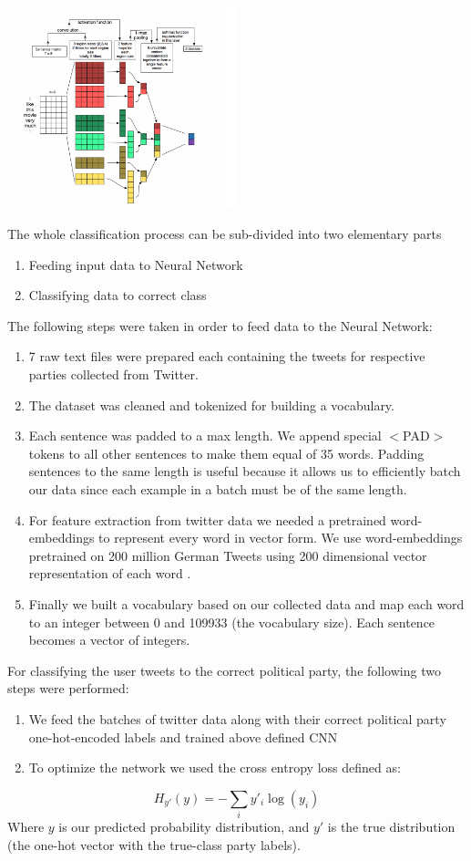 \documentclass[10pt, oneside]{article}
\begin{document}
\begin{multicols}{2}
\includegraphics[width=0.5\textwidth]{images/cnn_architecture2.png}




The whole classification process can be sub-divided into two elementary parts
\begin{enumerate}
\item Feeding input data to Neural Network
\item Classifying data to correct class
\end{enumerate}
The following steps were taken in order to feed data to the Neural Network:
\begin{enumerate}
\item 7 raw text files were prepared each containing the tweets for respective parties collected from Twitter.
\item The dataset was cleaned and tokenized for building a vocabulary.
\item Each sentence was padded to a max length. We append special $<$PAD$>$ tokens to all other sentences to make them equal of 35 words. Padding sentences to the same length is useful because it allows us to efficiently batch our data since each example in a batch must be of the same length.
\item For feature extraction from twitter data we needed a pretrained word-embeddings to represent every word in vector form. We use word-embeddings \cite{DBLP:journals/corr/abs-1301-3781} pretrained on 200 million German Tweets using 200 dimensional vector representation of each word \cite{cieliebak2017twitter}.  
\item Finally we built a vocabulary based on our collected data and map each word to an integer between 0 and 109933 (the vocabulary size). Each sentence becomes a vector of integers.
\end{enumerate}

For classifying the user tweets to the correct political party, the following two steps were performed:
\begin{enumerate}
	\item We feed the batches of twitter data along with their correct political party one-hot-encoded labels and trained above defined CNN 
	\item To optimize the network we used the cross entropy loss defined as:
\end{enumerate}
\begin{equation}
H_{y'}(y) = - \sum_{i} y'_{i} \log (y_{i})
\end{equation}
Where $y$ is our predicted probability distribution, and $y'$ is the true distribution (the one-hot vector with the true-class party labels). 



\end{multicols}
\end{document}
